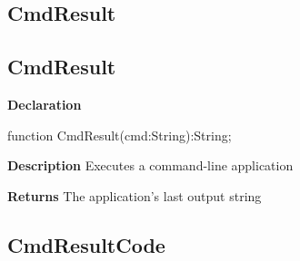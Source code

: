 \documentclass{report}
\newif\ifpdf
\begin{document}
\subsection*{\large{\textbf{CmdResult}}\normalsize\hspace{1ex}\hrulefill}
\else
\subsection*{CmdResult}
\fi
\label{utilities-CmdResult}
\begin{list}{}{
\setlength{\itemindent}{0cm}
\setlength{\listparindent}{0cm}
\setlength{\leftmargin}{\evensidemargin}
\addtolength{\leftmargin}{\tmplength}
\settowidth{\labelsep}{X}
\addtolength{\leftmargin}{\labelsep}
\setlength{\labelwidth}{\tmplength}
}
\item[\textbf{Declaration}\hfill]
\ifpdf
\begin{flushleft}
\fi
\begin{ttfamily}
function CmdResult(cmd:String):String;\end{ttfamily}

\ifpdf
\end{flushleft}
\fi

\par
\item[\textbf{Description}]
Executes a command{-}line application \par
\item[\textbf{Returns}]The application's last output string


\end{list}
\ifpdf
\subsection*{\large{\textbf{CmdResultCode}}\normalsize\hspace{1ex}\hrulefill}
\else
\end{document}

